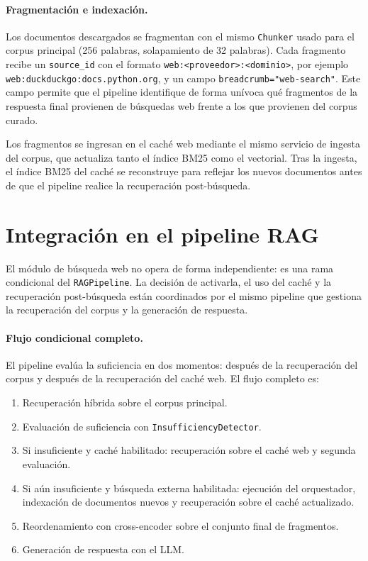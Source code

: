 \documentclass[11pt]{article}
\begin{document}
\paragraph{Fragmentación e indexación.}
Los documentos descargados se fragmentan con el mismo \texttt{Chunker} usado para el corpus
principal (256 palabras, solapamiento de 32 palabras). Cada fragmento recibe un
\texttt{source\_id} con el formato \texttt{web:<proveedor>:<dominio>}, por ejemplo
\texttt{web:duckduckgo:docs.python.org}, y un campo \texttt{breadcrumb="web-search"}.
Este campo permite que el pipeline identifique de forma unívoca qué fragmentos de la respuesta
final provienen de búsquedas web frente a los que provienen del corpus curado.

Los fragmentos se ingresan en el caché web mediante el mismo servicio de ingesta del corpus,
que actualiza tanto el índice BM25 como el vectorial. Tras la ingesta, el índice BM25 del
caché se reconstruye para reflejar los nuevos documentos antes de que el pipeline realice la
recuperación post-búsqueda.

\section{Integración en el pipeline RAG}

El módulo de búsqueda web no opera de forma independiente: es una rama condicional del
\texttt{RAGPipeline}. La decisión de activarla, el uso del caché y la recuperación
post-búsqueda están coordinados por el mismo pipeline que gestiona la recuperación del corpus
y la generación de respuesta.

\paragraph{Flujo condicional completo.}
El pipeline evalúa la suficiencia en dos momentos: después de la recuperación del corpus y
después de la recuperación del caché web. El flujo completo es:

\begin{enumerate}
\item Recuperación híbrida sobre el corpus principal.
\item Evaluación de suficiencia con \texttt{InsufficiencyDetector}.
\item Si insuficiente y caché habilitado: recuperación sobre el caché web y segunda evaluación.
\item Si aún insuficiente y búsqueda externa habilitada: ejecución del orquestador, indexación
      de documentos nuevos y recuperación sobre el caché actualizado.
\item Reordenamiento con cross-encoder sobre el conjunto final de fragmentos.
\item Generación de respuesta con el LLM.
\end{enumerate}
\end{document}
